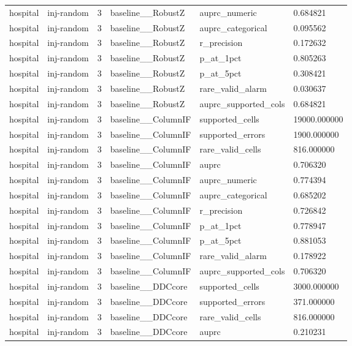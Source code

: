 \begin{tabular}{llllll}
hospital & inj-random & 3 & baseline\_\_RobustZ & auprc\_numeric & 0.684821 \\
hospital & inj-random & 3 & baseline\_\_RobustZ & auprc\_categorical & 0.095562 \\
hospital & inj-random & 3 & baseline\_\_RobustZ & r\_precision & 0.172632 \\
hospital & inj-random & 3 & baseline\_\_RobustZ & p\_at\_1pct & 0.805263 \\
hospital & inj-random & 3 & baseline\_\_RobustZ & p\_at\_5pct & 0.308421 \\
hospital & inj-random & 3 & baseline\_\_RobustZ & rare\_valid\_alarm & 0.030637 \\
hospital & inj-random & 3 & baseline\_\_RobustZ & auprc\_supported\_cols & 0.684821 \\
hospital & inj-random & 3 & baseline\_\_ColumnIF & supported\_cells & 19000.000000 \\
hospital & inj-random & 3 & baseline\_\_ColumnIF & supported\_errors & 1900.000000 \\
hospital & inj-random & 3 & baseline\_\_ColumnIF & rare\_valid\_cells & 816.000000 \\
hospital & inj-random & 3 & baseline\_\_ColumnIF & auprc & 0.706320 \\
hospital & inj-random & 3 & baseline\_\_ColumnIF & auprc\_numeric & 0.774394 \\
hospital & inj-random & 3 & baseline\_\_ColumnIF & auprc\_categorical & 0.685202 \\
hospital & inj-random & 3 & baseline\_\_ColumnIF & r\_precision & 0.726842 \\
hospital & inj-random & 3 & baseline\_\_ColumnIF & p\_at\_1pct & 0.778947 \\
hospital & inj-random & 3 & baseline\_\_ColumnIF & p\_at\_5pct & 0.881053 \\
hospital & inj-random & 3 & baseline\_\_ColumnIF & rare\_valid\_alarm & 0.178922 \\
hospital & inj-random & 3 & baseline\_\_ColumnIF & auprc\_supported\_cols & 0.706320 \\
hospital & inj-random & 3 & baseline\_\_DDCcore & supported\_cells & 3000.000000 \\
hospital & inj-random & 3 & baseline\_\_DDCcore & supported\_errors & 371.000000 \\
hospital & inj-random & 3 & baseline\_\_DDCcore & rare\_valid\_cells & 816.000000 \\
hospital & inj-random & 3 & baseline\_\_DDCcore & auprc & 0.210231 \\

\end{tabular}
